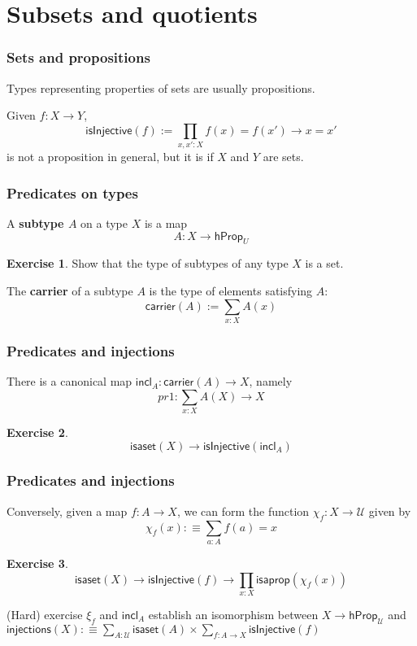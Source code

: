 \documentclass{beamer}
\newcommand{\fat}[1]{\textbf{#1}}
\newcommand{\constfont}[1]{\ensuremath{\mathsf{#1}}}
\newcommand{\U}{\mathcal{U}}
\newcommand{\hProp}{\constfont{hProp}}
\newcommand{\isaprop}{\constfont{isaprop}}
\newcommand{\isaset}{\constfont{isaset}}
\newcommand{\carrier}{\constfont{carrier}}
\newcommand{\incl}{\constfont{incl}}
\newcommand{\isInjective}{\constfont{isInjective}}
\theoremstyle{definition}
\newtheorem{exercise}{Exercise}
\begin{document}
\section{Subsets and quotients}

\begin{frame}
 \frametitle{Sets and propositions}

 Types representing properties of sets are usually propositions. \pause

 \begin{example}
   Given $f : X \to Y$,
   \[   \constfont{isInjective}(f) := \prod_{x, x' : X} f(x) = f(x') \to x = x' \]
   is not a proposition in general, but it is if $X$ and $Y$ are sets.
 \end{example}
\end{frame}

\begin{frame}
 \frametitle{Predicates on types}

    A \fat{subtype $A$} on a type $X$ is a map
    \[ A : X \to \hProp_U \]
  \begin{exercise}
   Show that the type of subtypes of any type $X$ is a set.
  \end{exercise}
  \pause
  The \fat{carrier} of a subtype $A$ is the type of elements satisfying $A$:
  \[ \carrier(A) := \sum_{x:X}A(x) \]
\end{frame}

\begin{frame}
 \frametitle{Predicates and injections}

 There is a canonical map $\incl_A:\carrier(A)\to{}X$\pause, namely
 \[pr1:\sum_{x:X}A(X)\to{}X\]
 \pause
 \begin{exercise}
   \[\isaset(X)\to\isInjective(\incl_A)\]
 \end{exercise}
\end{frame}

\begin{frame}
 \frametitle{Predicates and injections}

 Conversely, given a map $f:A\to{}X$, we can form the function $\chi_f:X\to\U$ given by
 \[
   \chi_f(x):\equiv\sum_{a:A} f(a)=x
 \]\pause

 \begin{exercise}
   \[
     \isaset(X)\to\isInjective(f)\to\prod_{x:X}\isaprop(\chi_f(x))
   \]
 \end{exercise}\pause
 \begin{block}{(Hard) exercise}
   $\xi_f$ and $\incl_A$ establish an isomorphism between $X\to\hProp_\U$ and
   $\constfont{injections}(X):\equiv\sum_{A:\U}\isaset(A)\times\sum_{f:A\to{}X}\isInjective(f)$
 \end{block}
\end{frame}
\end{document}
